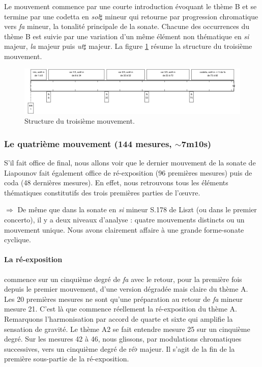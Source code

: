 Le mouvement commence par une courte introduction évoquant le thème B et se termine par une codetta en \emph{sol}$\sharp$ mineur qui retourne par progression chromatique vers \emph{fa} mineur, la tonalité principale de la sonate. Chacune des occurrences du thème B est suivie par une variation d'un même élément non thématique en \emph{si} majeur, \emph{la} majeur puis \emph{ut}$\sharp$ majeur. La figure \ref{schema-3} résume la structure du troisième mouvement.

\begin{figure}[!ht]
  \begin{bigcenter}
    \includegraphics[width=17.5cm, keepaspectratio]{frise-mvt3.png}
  \end{bigcenter}
  \caption{\label{schema-3}Structure du troisième mouvement.}
\end{figure}

\newpage

\subsubsection*{Le quatrième mouvement (144 mesures, $\sim$7m10s)}

S'il fait office de final, nous allons voir que le dernier mouvement de la sonate de Liapounov fait également office de ré-exposition (96 premières mesures) puis de coda (48 dernières mesures). En effet, nous retrouvons tous les éléments thématiques constitutifs des trois premières parties de l'œuvre.

$\Rightarrow$ De même que dans la sonate en \emph{si} mineur S.178 de Liszt (ou dans le premier concerto), il y a deux niveaux d'analyse : quatre mouvements distincts ou un mouvement unique. Nous avons clairement affaire à une grande forme-sonate cyclique.

\paragraph{La ré-exposition} commence sur un cinquième degré de \emph{fa} avec le retour, pour la première fois depuis le premier mouvement, d'une version dégradée mais claire du thème A. Les 20 premières mesures ne sont qu'une préparation au retour de \emph{fa} mineur mesure 21. C'est là que commence réellement la ré-exposition du thème A. Remarquons l'harmonisation par accord de quarte et sixte qui amplifie la sensation de gravité. Le thème A2 se fait entendre mesure 25 sur un cinquième degré. Sur les mesures 42 à 46, nous glissons, par modulations chromatiques successives, vers un cinquième degré de ré$\flat$ majeur. Il s'agit de la fin de la première sous-partie de la ré-exposition.


